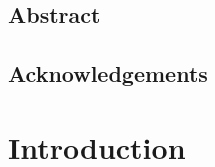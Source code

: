 








\section*{Abstract}


\newpage
\section*{Acknowledgements}


\clearpage

\setcounter{page}{1}
\tableofcontents

\chapter{Introduction}


